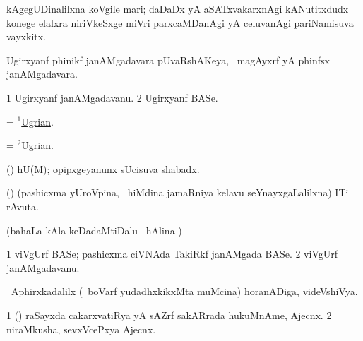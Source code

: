 \bentry
{}
\gl{\nA}
\expl{}
\bmng
kAgegUDinalilxna koVgile mari; daDaDx yA aSATxvakarxnAgi kANutitxdudx konege elalxra niriVkeSxge miVri parxcaMDanAgi yA celuvanAgi pariNamisuva vayxkitx. 
\emng
\eentry

\bentry
{} 
\gl{\gu}
\expl{}
\bmng
Ugirxyanf phinikf janAMgadavara pUvaRshAKeya, \kanmu\ magAyxrf yA phinfsx janAMgadavara. 
\emng
\eentry

\bentry
{} 
\gl{\nA}
\expl{}
\bmng
\bnum
\num{1} Ugirxyanf janAMgadavanu. 
\num{2} Ugirxyanf BASe. 
\enum
\emng
\eentry

\bentry
{} 
\gl{\gu}
\expl{}
\bmng
= \hyperlink{Ugrian(1)}{$^1$Ugrian}. 
\emng
\eentry

\bentry
{} 
\gl{\nA}
\expl{}
\bmng
= \hyperlink{Ugrian(2)}{$^2$Ugrian}. 
\emng
\eentry

\bentry
{}
\gl{\saMkiSx}
\expl{}
\bmng
{} 
\emng
\eentry

\bentry
{} 
\bmng
\BAavayx (\AmA) hU(M); opipxgeyanunx sUcisuva shabadx. 
\emng
\eentry

\bentry
{} 
\gl{\nA}
\expl{}
\bmng
(\ca) (pashicxma yUroVpina, \kanmu\ hiMdina jamaRniya kelavu seYnayxgaLalilxna) ITi rAvuta. 
\emng
\eentry

\bentry
{}
\gl{\saMkiSx}
\expl{}
\bmng
(bahaLa kAla keDadaMtiDalu \kanmu\ hAlina \vi)  
\emng
\eentry

\bentry
{} 
\gl{\nA}
\expl{}
\bmng
\bnum
\num{1} viVgUrf BASe; pashicxma ciVNAda TakiRkf janAMgada BASe. 
\num{2} viVgUrf janAMgadavanu. 
\enum
\emng
\eentry

\bentry
{} 
\gl{\nA}
\expl{}
\bmng
\da\ Aphirxkadalilx (\kanmu\ boVarf  yudadhxkikxMta muMcina) horanADiga, videVshiVya. 
\emng
\eentry

\bentry
{}
\gl{\saMkiSx}
\expl{}
\bmng
{} 
\emng
\eentry

\bentry
{}
\gl{\saMkiSx}
\expl{}
\bmng
{} 
\emng
\eentry

\bentry
{} 
\gl{\nA}
\bmng
\bnum
\num{1} (\ca) raSayxda cakarxvatiRya yA sAZrf sakARrada hukuMnAme, Ajecnx. 
\num{2} niraMkusha, sevxVcePxya Ajecnx. 
\enum
\emng
\eentry

